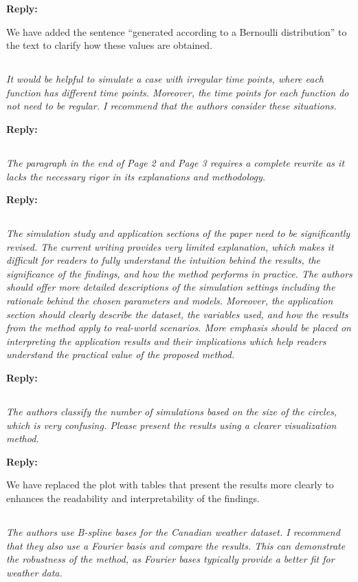 \documentclass[12pt,a4paper]{article}
\newcommand{\comments}[1]{\subsection{}
\begin{mdframed}[style=comments] 
        \textit{#1}
\end{mdframed}}
\newcommand{\reply}[1]{
    \noindent\textbf{Reply:}

\begin{mdframed}[style=replies] 
    #1
\end{mdframed}
}
\begin{document}
\reply{We have added the sentence ``generated according to a Bernoulli distribution'' to the text to clarify how these values are obtained.}


\comments{It would be helpful to simulate a case with irregular time points, where each function has different time points. Moreover, the time points for each function do not need to be regular. I recommend that the authors consider these situations.}

\reply{}


\comments{The paragraph in the end of Page 2 and Page 3 requires a complete rewrite as it lacks the necessary rigor in its explanations and methodology.}

\reply{}

\comments{The simulation study and application sections of the paper need to be significantly revised. The current writing provides very limited explanation, which makes it difficult for readers to fully understand the intuition behind the results, the significance of the findings, and how the method performs in practice. The authors should offer more detailed descriptions of the simulation settings including the rationale behind the chosen parameters and models. Moreover, the application section should clearly describe the dataset, the variables used, and how the results from the method apply to real-world scenarios. More emphasis should be placed on interpreting the application results and their implications which help readers understand the practical value of the proposed method.}

\reply{}

\comments{The authors classify the number of simulations based on the size of the circles, which is very confusing. Please present the results using a clearer visualization method.}

\reply{We have replaced the plot with tables that present the results more clearly to enhances the readability and interpretability of the findings.}

\comments{The authors use B-spline bases for the Canadian weather dataset. I recommend that they also use a Fourier basis and compare the results. This can demonstrate the robustness of the method, as Fourier bases typically provide a better fit for weather data.}
\end{document}
